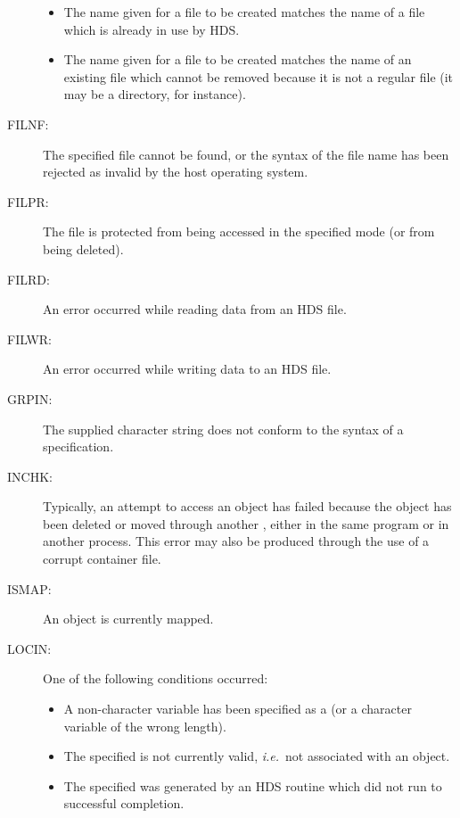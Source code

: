 \documentclass[twoside,11pt]{starlink}
\providecommand{\st}[1]{{\emph{#1}}}
\begin{document}
\begin{description}
\begin{itemize}
\item The name given for a file to be created matches the name of a file which
is already in use by HDS.

\item The name given for a file to be created matches the name of an existing
file which cannot be removed because it is not a regular file (it may be a
directory, for instance).

\end{itemize}

\item [FILNF:]
The specified file cannot be found, or the syntax of the file name has been
rejected as invalid by the host operating system.

\item [FILPR:]
The file is protected from being accessed in the specified mode (or from being
deleted).

\item [FILRD:]
An error occurred while reading data from an HDS file.

\item [FILWR:]
An error occurred while writing data to an HDS file.

\item [GRPIN:]
The supplied character string does not conform to the syntax of a 
specification.

\item [INCHK:]
Typically, an attempt to access an object has failed because the object has
been deleted or moved through another , either in the same program or in
another process. This error may also be produced through the use of a corrupt
container file.

\item [ISMAP:]
An object is currently mapped.

\item [LOCIN:]
One of the following conditions occurred:

\begin{itemize}
\item A non-character variable has been specified as a  (or a character
variable of the wrong length).

\item The specified  is not currently valid, \st{i.e.}\ not associated
with an object.

\item The specified  was generated by an HDS routine which did not run
to successful completion.


\end{itemize}
\end{description}
\end{document}
